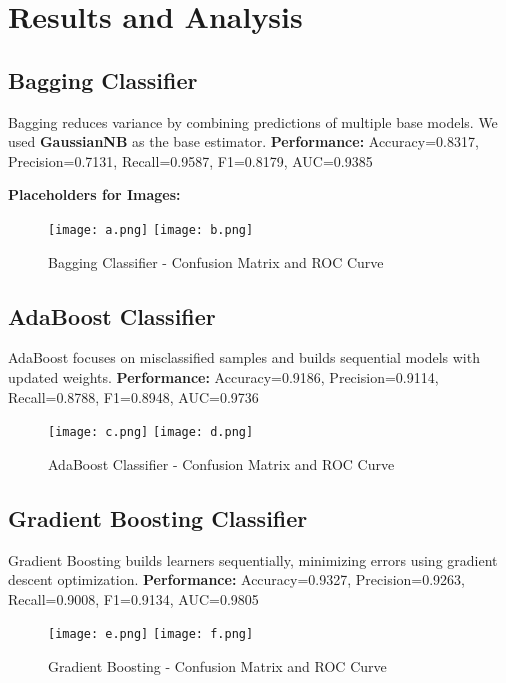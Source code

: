 \documentclass[12pt]{article}
\begin{document}
\section{Results and Analysis}

\subsection{Bagging Classifier}
Bagging reduces variance by combining predictions of multiple base models. We used \textbf{GaussianNB} as the base estimator.  
\newline
\textbf{Performance:}  
Accuracy=0.8317, Precision=0.7131, Recall=0.9587, F1=0.8179, AUC=0.9385  

\textbf{Placeholders for Images:}  
\begin{figure}[h!]
\centering
\texttt{[image: a.png]}
\texttt{[image: b.png]}
\caption{Bagging Classifier - Confusion Matrix and ROC Curve}
\end{figure}

\subsection{AdaBoost Classifier}
AdaBoost focuses on misclassified samples and builds sequential models with updated weights.  
\newline
\textbf{Performance:}  
Accuracy=0.9186, Precision=0.9114, Recall=0.8788, F1=0.8948, AUC=0.9736  

\begin{figure}[h!]
\centering
\texttt{[image: c.png]}
\texttt{[image: d.png]}
\caption{AdaBoost Classifier - Confusion Matrix and ROC Curve}
\end{figure}

\subsection{Gradient Boosting Classifier}
Gradient Boosting builds learners sequentially, minimizing errors using gradient descent optimization.  
\newline
\textbf{Performance:}  
Accuracy=0.9327, Precision=0.9263, Recall=0.9008, F1=0.9134, AUC=0.9805  

\begin{figure}[h!]
\centering
\texttt{[image: e.png]}
\texttt{[image: f.png]}
\caption{Gradient Boosting - Confusion Matrix and ROC Curve}
\end{figure}
\end{document}

